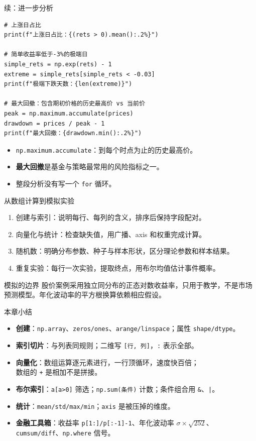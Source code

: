 \documentclass[9pt]{ctexbeamer}
\begin{document}
\begin{frame}[fragile]{续：进一步分析}
	\begin{lstlisting}
# 上涨日占比
print(f"上涨日占比：{(rets > 0).mean():.2%}")

# 简单收益率低于-3%的极端日
simple_rets = np.exp(rets) - 1
extreme = simple_rets[simple_rets < -0.03]
print(f"极端下跌天数：{len(extreme)}")

# 最大回撤：包含期初价格的历史最高价 vs 当前价
peak = np.maximum.accumulate(prices)
drawdown = prices / peak - 1
print(f"最大回撤：{drawdown.min():.2%}")
\end{lstlisting}
	\begin{itemize}
		\item \texttt{np.maximum.accumulate}：到每个时点为止的历史最高价。
		\item \textbf{最大回撤}是基金与策略最常用的风险指标之一。
		\item 整段分析没有写一个 \texttt{for} 循环。
	\end{itemize}
\end{frame}

\begin{frame}{从数组计算到模拟实验}
\begin{enumerate}
\item 创建与索引：说明每行、每列的含义，排序后保持字段配对。
\item 向量化与统计：检查缺失值，用广播、axis 和权重完成计算。
\item 随机数：明确分布参数、种子与样本形状，区分理论参数和样本结果。
\item 重复实验：每行一次实验，提取终点，用布尔均值估计事件概率。
\end{enumerate}
\begin{block}{模拟的边界}
股价案例采用独立同分布的正态对数收益率，只用于教学，不是市场预测模型。年化波动率的平方根换算依赖相应假设。
\end{block}
\end{frame}

\begin{frame}{本章小结}
	\begin{itemize}
		\item \textbf{创建}：\texttt{np.array}、\texttt{zeros/ones}、\texttt{arange/linspace}；属性 \texttt{shape/dtype}。
		\item \textbf{索引切片}：与列表同规则；二维写 \texttt{[行, 列]}，\texttt{:} 表示全部。
		\item \textbf{向量化}：数组运算逐元素进行，一行顶循环，速度快百倍；\\
		\alert{数组的 \texttt{+} 是相加不是拼接}。
		\item \textbf{布尔索引}：\texttt{a[a>0]} 筛选；\texttt{np.sum(条件)} 计数；条件组合用 \texttt{\&}、\texttt{|}。
		\item \textbf{统计}：\texttt{mean/std/max/min}；\texttt{axis} 是被压掉的维度。
		\item \textbf{金融工具箱}：收益率 \texttt{p[1:]/p[:-1]-1}、年化波动率 $\sigma\times\sqrt{252}$、\texttt{cumsum/diff}、\texttt{np.where} 信号。
	\end{itemize}
\end{frame}
\end{document}
